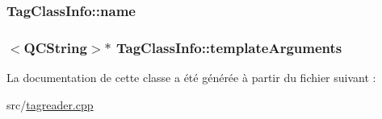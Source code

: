 \subsubsection[{name}]{ Tag\+Class\+Info\+::name}\label{class_tag_class_info_a79d7786b7290613addec8ad9e5a395e4}
\hypertarget{class_tag_class_info_adfe7ae86150e4eeff7f7e8817fc171ff}{}
\subsubsection[{template\+Arguments}]{$<${\bf Q\+C\+String}$>$$\ast$ Tag\+Class\+Info\+::template\+Arguments}\label{class_tag_class_info_adfe7ae86150e4eeff7f7e8817fc171ff}


La documentation de cette classe a été générée à partir du fichier suivant \+:\begin{DoxyCompactItemize}
\item 
src/\hyperlink{tagreader_8cpp}{tagreader.\+cpp}\end{DoxyCompactItemize}
